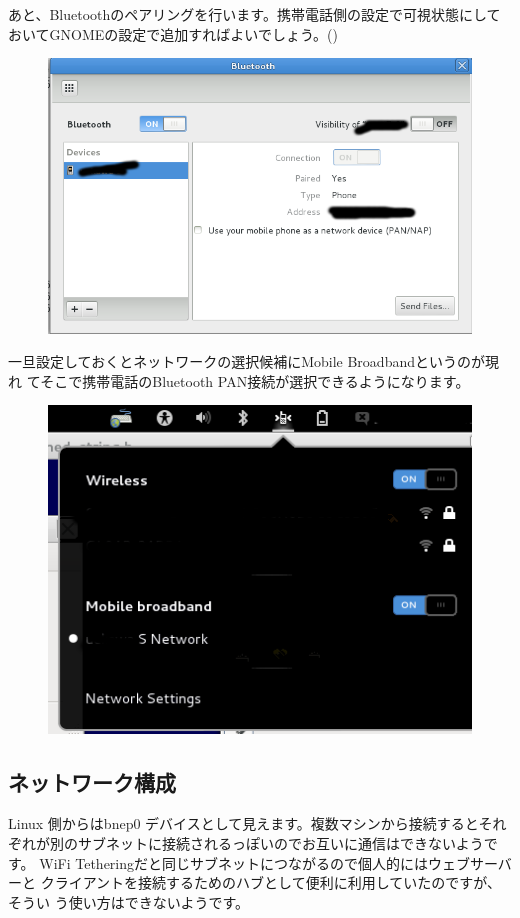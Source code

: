 \documentclass[mingoth,a4paper]{jsarticle}
\begin{document}
あと、Bluetoothのペアリングを行います。携帯電話側の設定で可視状態にして
おいてGNOMEの設定で追加すればよいでしょう。()

\begin{figure}[H]
 \begin{center}
  \includegraphics[width=0.5\hsize]{image201211/bt2.png}
  \label{fig:gnome-bt2}
 \end{center}
\end{figure}

一旦設定しておくとネットワークの選択候補にMobile Broadbandというのが現れ
てそこで携帯電話のBluetooth PAN接続が選択できるようになります。

\begin{figure}[H]
 \begin{center}
  \includegraphics[width=0.5\hsize]{image201211/bt1.png}
  \label{fig:gnome-bt1}
 \end{center}
\end{figure}

\subsection{ネットワーク構成}

Linux 側からはbnep0 デバイスとして見えます。複数マシンから接続するとそれ
ぞれが別のサブネットに接続されるっぽいのでお互いに通信はできないようです。
WiFi Tetheringだと同じサブネットにつながるので個人的にはウェブサーバーと
クライアントを接続するためのハブとして便利に利用していたのですが、そうい
う使い方はできないようです。
\end{document}
